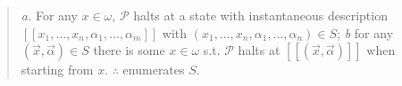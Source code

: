 \documentclass[a4paper, 12pt]{article}
\begin{document}
\begin{quote}
\textit{a.} For any $x \in \omega$, $\mathcal{P}$ halts at a state with
instantaneous description $[\![ x_1, \ldots, x_n, \alpha_1, \ldots, \alpha_m
]\!]$ with $(x_1, \ldots, x_n, \alpha_1, \ldots, \alpha_n) \in S$; \textit{b}
for any $(\vec{x}, \vec{\alpha}) \in S$ there is some $x \in \omega$ s.t.
$\mathcal{P}$ halts at $[\![ (\vec{x}, \vec{\alpha})  ]\!]$ when starting from
$x$. $\therefore $  enumerates $S$.


\end{quote}
\normalsize
\end{document}
